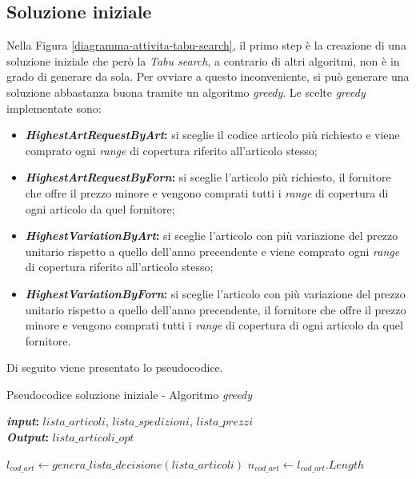 \subsection{Soluzione iniziale}
\label{sec:soluzione-iniziale}
\noindent Nella Figura \ref{diagramma-attivita-tabu-search}, il primo step è la creazione di una soluzione iniziale che
però la \textit{Tabu search}, a contrario di altri algoritmi, non è in grado di generare da sola. Per ovviare a questo inconveniente,
si può generare una soluzione abbastanza buona tramite un algoritmo \textit{greedy}.
Le scelte \textit{greedy} implementate sono:
\begin{itemize}
    \item \textbf{\textit{HighestArtRequestByArt}:} si sceglie
    il codice articolo più richiesto e viene comprato ogni
    \textit{range} di copertura riferito all'articolo stesso;
    \item \textbf{\textit{HighestArtRequestByForn}:} si sceglie
    l'articolo più richiesto, il fornitore che
    offre il prezzo minore e vengono comprati tutti i \textit{range}
    di copertura di ogni articolo
    da quel fornitore;
    \item \textbf{\textit{HighestVariationByArt}:} si sceglie
    l'articolo con più variazione del prezzo unitario rispetto a quello dell'anno
    precendente e viene comprato ogni
    \textit{range} di copertura riferito all'articolo stesso;
    \item \textbf{\textit{HighestVariationByForn}:} si sceglie
    l'articolo con più variazione del prezzo unitario rispetto a quello dell'anno
    precendente, il fornitore che
    offre il prezzo minore e vengono comprati tutti i \textit{range}
    di copertura di ogni articolo
    da quel fornitore.
\end{itemize}
Di seguito viene presentato lo pseudocodice.
\vspace*{\fill}
\begin{algorithm}
    \captionsetup{labelformat=empty}
    \caption{Pseudocodice soluzione iniziale - Algoritmo \textit{greedy}}
    \vspace{0.1cm}
    \hspace*{\algorithmicindent} \textbf{\textit{input}:} {$lista\_articoli$}, {$lista\_spedizioni$}, {$lista\_prezzi$}\\
    \hspace*{\algorithmicindent} \textbf{\textit{Output}:} {$lista\_articoli\_opt$}
    \begin{algorithmic}[1]
        \State $l_{cod\_art} \gets genera\_lista\_decisione(lista\_articoli)$
        \State $n_{cod\_art} \gets l_{cod\_art}.Length$
    \end{algorithmic}
\end{algorithm}
